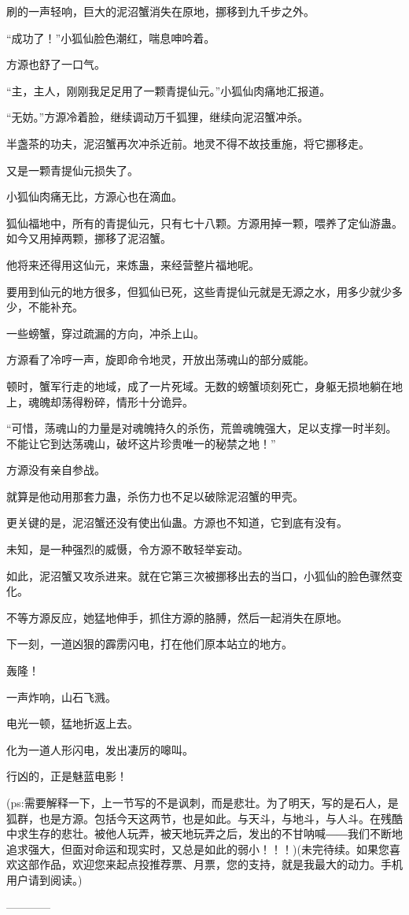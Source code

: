 \begin{this_body}
刷的一声轻响，巨大的泥沼蟹消失在原地，挪移到九千步之外。

“成功了！”小狐仙脸色潮红，喘息呻吟着。

方源也舒了一口气。

“主，主人，刚刚我足足用了一颗青提仙元。”小狐仙肉痛地汇报道。

“无妨。”方源冷着脸，继续调动万千狐狸，继续向泥沼蟹冲杀。

半盏茶的功夫，泥沼蟹再次冲杀近前。地灵不得不故技重施，将它挪移走。

又是一颗青提仙元损失了。

小狐仙肉痛无比，方源心也在滴血。

狐仙福地中，所有的青提仙元，只有七十八颗。方源用掉一颗，喂养了定仙游蛊。如今又用掉两颗，挪移了泥沼蟹。

他将来还得用这仙元，来炼蛊，来经营整片福地呢。

要用到仙元的地方很多，但狐仙已死，这些青提仙元就是无源之水，用多少就少多少，不能补充。

一些螃蟹，穿过疏漏的方向，冲杀上山。

方源看了冷哼一声，旋即命令地灵，开放出荡魂山的部分威能。

顿时，蟹军行走的地域，成了一片死域。无数的螃蟹顷刻死亡，身躯无损地躺在地上，魂魄却荡得粉碎，情形十分诡异。

“可惜，荡魂山的力量是对魂魄持久的杀伤，荒兽魂魄强大，足以支撑一时半刻。不能让它到达荡魂山，破坏这片珍贵唯一的秘禁之地！”

方源没有亲自参战。

就算是他动用那套力蛊，杀伤力也不足以破除泥沼蟹的甲壳。

更关键的是，泥沼蟹还没有使出仙蛊。方源也不知道，它到底有没有。

未知，是一种强烈的威慑，令方源不敢轻举妄动。

如此，泥沼蟹又攻杀进来。就在它第三次被挪移出去的当口，小狐仙的脸色骤然变化。

不等方源反应，她猛地伸手，抓住方源的胳膊，然后一起消失在原地。

下一刻，一道凶狠的霹雳闪电，打在他们原本站立的地方。

轰隆！

一声炸响，山石飞溅。

电光一顿，猛地折返上去。

化为一道人形闪电，发出凄厉的嗥叫。

行凶的，正是魅蓝电影！

(ps:需要解释一下，上一节写的不是讽刺，而是悲壮。为了明天，写的是石人，是狐群，也是方源。包括今天这两节，也是如此。与天斗，与地斗，与人斗。在残酷中求生存的悲壮。被他人玩弄，被天地玩弄之后，发出的不甘呐喊――我们不断地追求强大，但面对命运和现实时，又总是如此的弱小！！！)(未完待续。如果您喜欢这部作品，欢迎您来起点投推荐票、月票，您的支持，就是我最大的动力。手机用户请到阅读。)

------------

\end{this_body}

